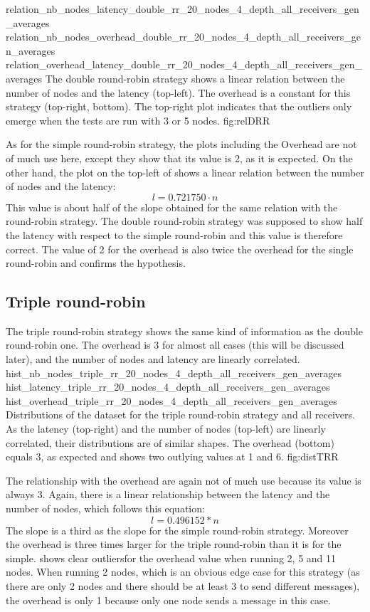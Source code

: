 \triplefigure
    {relation_nb_nodes_latency_double_rr_20_nodes_4_depth_all_receivers_gen_averages}
    {relation_nb_nodes_overhead_double_rr_20_nodes_4_depth_all_receivers_gen_averages}
    {relation_overhead_latency_double_rr_20_nodes_4_depth_all_receivers_gen_averages}
    {The double round-robin strategy shows a linear relation between the number of
    nodes and the latency (top-left). The overhead is a constant for this
    strategy (top-right, bottom). The top-right plot indicates that the outliers
    only emerge when the tests are run with 3 or 5 nodes.}
    {fig:relDRR}

As for the simple round-robin strategy, the plots including the Overhead are not
of much use here, except they show that its value is 2, as it is expected. 
On the other hand, the plot on the top-left of  shows a
linear relation between the number of nodes and the latency: 
\[l = 0.721750 \cdot n\]
This value is about half of the slope obtained for the same relation with the
round-robin strategy. The double round-robin strategy was supposed to show half
the latency with respect to the simple round-robin and this value is therefore
correct. The value of 2 for the overhead is also twice the overhead for the
single round-robin and confirms the hypothesis.
    

\FloatBarrier
\subsection{Triple round-robin}
The triple round-robin strategy shows  the same kind of information as the
double round-robin one. The overhead is 3 for almost all cases (this will be
discussed later), and the number of nodes and latency are linearly correlated.
\triplefigure
    {hist_nb_nodes_triple_rr_20_nodes_4_depth_all_receivers_gen_averages}
    {hist_latency_triple_rr_20_nodes_4_depth_all_receivers_gen_averages}
    {hist_overhead_triple_rr_20_nodes_4_depth_all_receivers_gen_averages}
    {Distributions of the dataset for the triple round-robin strategy and all
    receivers. As the latency (top-right) and the number of nodes (top-left) are
    linearly correlated, their distributions are of similar shapes. The
    overhead (bottom) equals 3, as expected and shows two outlying values at 1
    and 6.}
    {fig:distTRR}

The relationship with the overhead are again not of much use because its value
is always 3. Again, there is a linear relationship between the latency and the
number of nodes, which follows this equation:
    \[l = 0.496152 * n\]
The slope is a third as the slope for the simple round-robin strategy. Moreover
the overhead is three times larger for the triple round-robin than it is for the
simple.
 shows clear outliersfor the overhead value when running
2, 5 and 11 nodes. When running 2 nodes, which is an obvious edge case for this
strategy (as there are only 2 nodes and there should be at least 3 to send
different messages), the overhead is only 1 because only one node sends a
message in this case. 


